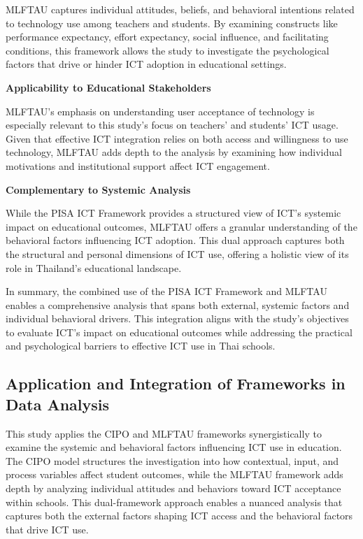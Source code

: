 \documentclass[
]{article}
\begin{document}
MLFTAU captures individual attitudes, beliefs, and behavioral intentions
related to technology use among teachers and students. By examining
constructs like performance expectancy, effort expectancy, social
influence, and facilitating conditions, this framework allows the study
to investigate the psychological factors that drive or hinder ICT
adoption in educational settings.

\textbf{Applicability to Educational Stakeholders}

MLFTAU's emphasis on understanding user acceptance of technology is
especially relevant to this study's focus on teachers' and students' ICT
usage. Given that effective ICT integration relies on both access and
willingness to use technology, MLFTAU adds depth to the analysis by
examining how individual motivations and institutional support affect
ICT engagement.

\textbf{Complementary to Systemic Analysis}

While the PISA ICT Framework provides a structured view of ICT's
systemic impact on educational outcomes, MLFTAU offers a granular
understanding of the behavioral factors influencing ICT adoption. This
dual approach captures both the structural and personal dimensions of
ICT use, offering a holistic view of its role in Thailand's educational
landscape.

In summary, the combined use of the PISA ICT Framework and MLFTAU
enables a comprehensive analysis that spans both external, systemic
factors and individual behavioral drivers. This integration aligns with
the study's objectives to evaluate ICT's impact on educational outcomes
while addressing the practical and psychological barriers to effective
ICT use in Thai schools.

\hypertarget{application-and-integration-of-frameworks-in-data-analysis}{%
\subsection{Application and Integration of Frameworks in Data
Analysis}\label{application-and-integration-of-frameworks-in-data-analysis}}

This study applies the CIPO and MLFTAU frameworks synergistically to
examine the systemic and behavioral factors influencing ICT use in
education. The CIPO model structures the investigation into how
contextual, input, and process variables affect student outcomes, while
the MLFTAU framework adds depth by analyzing individual attitudes and
behaviors toward ICT acceptance within schools. This dual-framework
approach enables a nuanced analysis that captures both the external
factors shaping ICT access and the behavioral factors that drive ICT
use.
\end{document}

